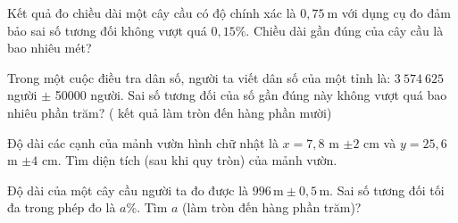 \begin{bt}%
Kết quả đo chiều dài một cây cầu có độ chính xác là $0{,}75\ \mathrm{m}$ với dụng cụ đo đảm bảo sai số tương đối không vượt quá $0{,}15\%$. Chiều dài gần đúng của cây cầu là bao nhiêu mét?
\end{bt}

\begin{bt}%
 Trong một cuộc điều tra dân số, người ta viết dân số của một tỉnh là: $3\ 574\ 625$ người $\pm$ 50000 người. Sai số tương đối của số gần đúng này không vượt quá bao nhiêu phần trăm? ( kết quả làm tròn đến hàng phần mười)
\end{bt}

\begin{bt}%
	Độ dài các cạnh của mảnh vườn hình chữ nhật là $x=7{,}8$ m $\pm 2$ cm và $y=25{,}6$ m $\pm 4$ cm. Tìm diện tích (sau khi quy tròn) của mảnh vườn.
\end{bt}

\begin{bt}%
Độ dài của một cây cầu người ta đo được là $996\,\text{m}\pm 0{,}5\,\text{m}$. Sai số tương đối tối đa trong phép đo là $a \%$. Tìm $a$ (làm tròn đến hàng phần trăm)?
\end{bt}

